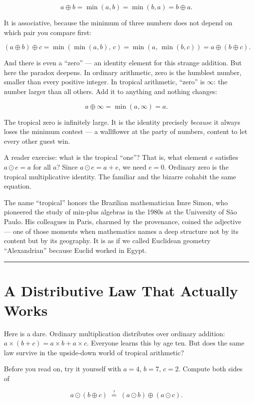 \[a \oplus b = \min(a,b) = \min(b,a) = b \oplus a.\]

It is associative, because the minimum of three numbers does not depend on which pair you compare first:

\[(a \oplus b) \oplus c = \min(\min(a,b),\, c) = \min(a,\, \min(b,c)) = a \oplus (b \oplus c).\]

And there is even a ``zero'' --- an identity element for this strange addition. But here the paradox deepens. In ordinary arithmetic, zero is the humblest number, smaller than every positive integer. In tropical arithmetic, ``zero'' is \(\infty\): the number larger than all others. Add it to anything and nothing changes:

\[a \oplus \infty = \min(a, \infty) = a.\]

The tropical zero is infinitely large. It is the identity precisely \emph{because} it always loses the minimum contest --- a wallflower at the party of numbers, content to let every other guest win.

A reader exercise: what is the tropical ``one''? That is, what element \(e\) satisfies \(a \odot e = a\) for all \(a\)? Since \(a \odot e = a + e\), we need \(e = 0\). Ordinary zero is the tropical multiplicative identity. The familiar and the bizarre cohabit the same equation.

The name ``tropical'' honors the Brazilian mathematician Imre Simon, who pioneered the study of min-plus algebras in the 1980s at the University of São Paulo. His colleagues in Paris, charmed by the provenance, coined the adjective --- one of those moments when mathematics names a deep structure not by its content but by its geography. It is as if we called Euclidean geometry ``Alexandrian'' because Euclid worked in Egypt.

\bigskip\noindent\rule{\linewidth}{0.4pt}\bigskip

\section{A Distributive Law That Actually Works}
Here is a dare. Ordinary multiplication distributes over ordinary addition: \(a \times (b + c) = a \times b + a \times c\). Everyone learns this by age ten. But does the same law survive in the upside-down world of tropical arithmetic?

Before you read on, try it yourself with \(a = 4\), \(b = 7\), \(c = 2\). Compute both sides of

\[a \odot (b \oplus c) \;\stackrel{?}{=}\; (a \odot b) \oplus (a \odot c).\]

